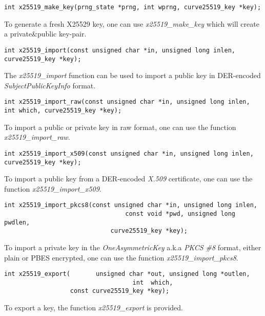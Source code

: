 \documentclass[synpaper]{book}
\begin{document}
\begin{verbatim}
int x25519_make_key(prng_state *prng, int wprng, curve25519_key *key);
\end{verbatim}

To generate a fresh X25529 key, one can use \textit{x25519\_make\_key} which will create a private\&public key-pair.
\begin{verbatim}
int x25519_import(const unsigned char *in, unsigned long inlen, curve25519_key *key);
\end{verbatim}

The \textit{x25519\_import} function can be used to import a public key in DER-encoded \textit{SubjectPublicKeyInfo} format.

\begin{verbatim}
int x25519_import_raw(const unsigned char *in, unsigned long inlen, int which, curve25519_key *key);
\end{verbatim}

To import a public or private key in raw format, one can use the function \textit{x25519\_import\_raw}.

\begin{verbatim}
int x25519_import_x509(const unsigned char *in, unsigned long inlen, curve25519_key *key);
\end{verbatim}

To import a public key from a DER-encoded \textit{X.509} certificate, one can use the function \textit{x25519\_import\_x509}.

\begin{verbatim}
int x25519_import_pkcs8(const unsigned char *in, unsigned long inlen,
                                 const void *pwd, unsigned long pwdlen,
                             curve25519_key *key);
\end{verbatim}

To import a private key in the \textit{OneAsymmetricKey} a.k.a \textit{PKCS \#8} format, either plain or PBES encrypted,
one can use the function \textit{x25519\_import\_pkcs8}.

\begin{verbatim}
int x25519_export(       unsigned char *out, unsigned long *outlen,
                                   int  which,
                  const curve25519_key *key);
\end{verbatim}

To export a key, the function \textit{x25519\_export} is provided.
\end{document}
